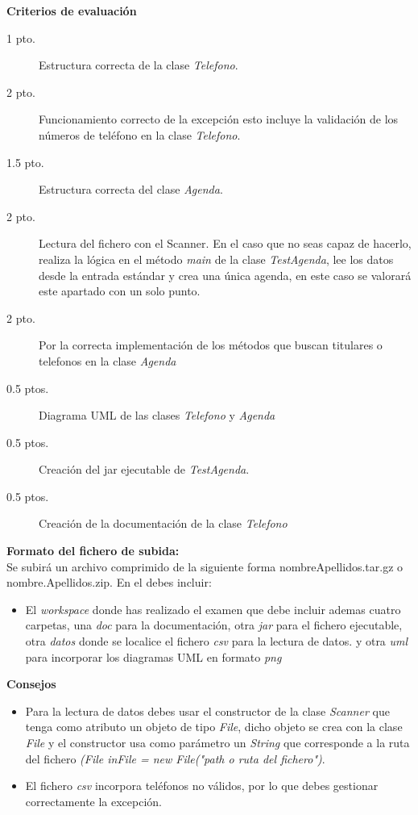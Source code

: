 \documentclass[addpoints,12pt]{exam}
\begin{document}
\begin{questions}
\newpage
\textbf{Criterios de evaluación}
\begin{description}
\item[1 pto.] Estructura correcta de la clase \emph{Telefono}.
\item[2 pto.] Funcionamiento correcto de la excepción esto incluye la validación de los números de teléfono en la clase \emph{Telefono}.
\item[1.5 pto.] Estructura correcta del clase \emph{Agenda}.
\item[2 pto.] Lectura del fichero con el Scanner. En el caso que no seas capaz de hacerlo, realiza la lógica en el método \emph{main} de la clase \emph{TestAgenda}, lee los datos desde la entrada estándar y crea una única agenda, en este caso se valorará este apartado con un solo punto.
\item[2 pto.] Por la correcta implementación de los métodos que buscan titulares o telefonos en la clase \emph{Agenda}
\item[0.5 ptos.] Diagrama UML de las clases \emph{Telefono} y \emph{Agenda} 
\item[0.5 ptos.] Creación del jar ejecutable de \emph{TestAgenda}.
\item[0.5 ptos.] Creación de la documentación de la clase \emph{Telefono} 
\end{description}
\end{questions}
\textbf{Formato del fichero de subida:}\\
Se subirá un archivo comprimido de la siguiente forma nombreApellidos.tar.gz o nombre.Apellidos.zip. En el debes incluir:
\begin{itemize}
\item El \emph{workspace} donde has realizado el examen que debe incluir ademas cuatro carpetas, una \emph{doc} para la documentación, otra \emph{jar} para el fichero ejecutable, otra \emph{datos} donde se localice el fichero \emph{csv} para la lectura de datos. y otra \emph{uml} para incorporar los diagramas UML en formato \emph{png}
\end{itemize}
\textbf{Consejos}
\begin{itemize}
\item Para la lectura de datos debes usar el constructor de la clase \emph{Scanner} que tenga como atributo un objeto de tipo \emph{File}, dicho objeto se crea con la clase \emph{File} y el constructor usa como parámetro un \emph{String} que corresponde a la ruta del fichero \emph{(File inFile = new File("path o ruta del fichero")}.
\item El fichero \emph{csv} incorpora teléfonos no válidos, por lo que debes gestionar correctamente la excepción.
\end{itemize}
\end{document}
